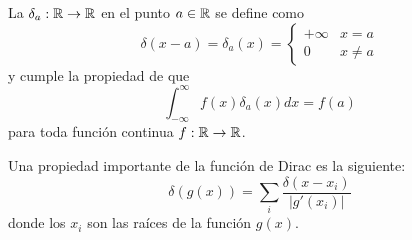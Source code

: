 \begin{ejemplo}
\end{ejemplo}

\begin{definicion}
    La  $\delta_a: \mathbb{R} \to \mathbb{R}$ en el punto $a \in \mathbb{R}$ se define como
    \begin{equation*}
        \delta(x-a)=\delta_a(x) = 
        \begin{cases}
            +\infty & x=a \\
            0 & x\neq a
        \end{cases}
    \end{equation*}
    y cumple la propiedad de que
    \begin{equation*}
        \int_{-\infty}^{\infty} f(x) \delta_a(x) dx = f(a)
    \end{equation*}
    para toda función continua $f:\mathbb{R}\to\mathbb{R}$.
\end{definicion}

\begin{prop}
    Una propiedad importante de la función de Dirac es la siguiente:
    $$\delta(g(x)) = \sum_{i} \frac{\delta(x - x_i)}{|g'(x_i)|}$$
    donde los $x_i$ son las raíces de la función $g(x)$.
\end{prop}



